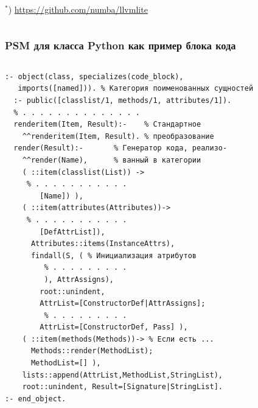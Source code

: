 \documentclass[10pt]{beamer}
\begin{document}
\begin{frame}[fragile]
\begin{columns}
\begin{column}{0.4\textwidth}
  ${}^*$) \url{https://github.com/numba/llvmlite}
    \end{column}
  \end{columns}
\end{frame}

\begin{frame}[fragile]
  \frametitle{PSM для класса Python как пример блока кода}
  \begin{columns}
    \begin{column}{0.6\textwidth}
      \flushleft
\begin{verbatim}
:- object(class, specializes(code_block),
   imports([named])). % Категория поименованных сущностей
  :- public([classlist/1, methods/1, attributes/1]).
  % . . . . . . . . . . . . . .
  renderitem(Item, Result):-    % Стандартное
    ^^renderitem(Item, Result). % преобразование
  render(Result):-       % Генератор кода, реализо-
    ^^render(Name),      % ванный в категории
    ( ::item(classlist(List)) ->
     % . . . . . . . . . . .
        [Name]) ),
    ( ::item(attributes(Attributes))->
     % . . . . . . . . . . .
        [DefAttrList]),
      Attributes::items(InstanceAttrs),
      findall(S, ( % Инициализация атрибутов
         % . . . . . . . . .
         ), AttrAssigns),
        root::unindent,
        AttrList=[ConstructorDef|AttrAssigns];
         % . . . . . . . . .
        AttrList=[ConstructorDef, Pass] ),
    ( ::item(methods(Methods))-> % Если есть ...
      Methods::render(MethodList);
      MethodList=[] ),
    lists::append(AttrList,MethodList,StringList),
    root::unindent, Result=[Signature|StringList].
:- end_object.
\end{verbatim}
    \end{column}
    \begin{column}{0.4\linewidth}

\end{column}
\end{columns}
\end{frame}
\end{document}
